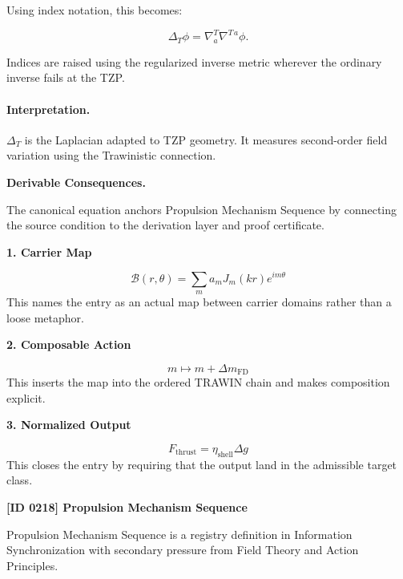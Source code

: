 Using index notation, this becomes:

\begin{equation}
\boxed{
\Delta_T\phi
=
\nabla^{T}_{a}\nabla^{T\,a}\phi .
}
\end{equation}

Indices are raised using the regularized inverse metric wherever the ordinary inverse fails at the TZP.

\paragraph{Interpretation.}
$\Delta_T$ is the Laplacian adapted to TZP geometry. It measures second-order field variation using the Trawinistic connection.

\par\vspace{0.35em}
\noindent\textbf{Derivable Consequences.}\quad
\begingroup
\footnotesize
\raggedright
The canonical equation anchors Propulsion Mechanism Sequence by connecting the source condition to the derivation layer and proof certificate.
\par\endgroup

\noindent\textbf{1. Carrier Map}\par
\[
\mathcal{B}(r,\theta)=\sum_m a_m J_m(kr)e^{im\theta}
\]
\noindent This names the entry as an actual map between carrier domains rather than a loose metaphor.\par
\noindent\textbf{2. Composable Action}\par
\[
m\mapsto m+\Delta m_{\mathrm{FD}}
\]
\noindent This inserts the map into the ordered TRAWIN chain and makes composition explicit.\par
\noindent\textbf{3. Normalized Output}\par
\[
F_{\mathrm{thrust}}=\eta_{\mathrm{shell}}\Delta g
\]
\noindent This closes the entry by requiring that the output land in the admissible target class.\par

\clearpage
\noindent\textbf{[ID 0218] Propulsion Mechanism Sequence}\par
\vspace{0.35em}
\begingroup\small
{}
Propulsion Mechanism Sequence is a registry definition in Information Synchronization with secondary pressure from Field Theory and Action Principles.

